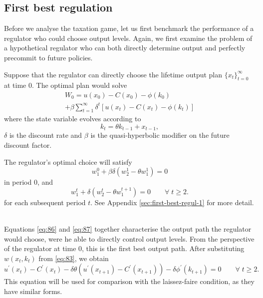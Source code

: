 \label{sec:benchm-regul}

\subsection{First best regulation}

\label{sec:first-best-regul}

Before we analyse the taxation game, let us first benchmark the performance
of a regulator who could choose output levels. Again, we first examine the
problem of a hypothetical regulator who can both directly determine output
and perfectly precommit to future policies. 

Suppose that the regulator can directly choose the lifetime output plan $%
\{x_{t}\}_{t=0}^{\infty }$ at time $0$. The optimal plan would solve 
\begin{multline}
W_{0}=u(x_{0})-C(x_{0})-\phi (k_{0})  \label{eq:38} \\
+\beta \sum_{t=1}^{\infty }\delta ^{t}\left[ u(x_{t})-C(x_{t})-\phi (k_{t})%
\right]
\end{multline}%
where the state variable evolves according to%
\[
k_{t}=\theta k_{t-1}+x_{t-1}, 
\]%
$\delta $ is the discount rate and $\beta $ is the quasi-hyperbolic modifier
on the future discount factor.

The regulator's optimal choice will satisfy 
\begin{equation}
w_{1}^{0}+\beta \delta \left( w_{2}^{1}-\theta w_{1}^{1}\right) =0
\label{eq:86}
\end{equation}%
in period 0, and 
\begin{equation}
w_{1}^{t}+\delta \left( w_{2}^{t}-\theta w_{1}^{t+1}\right) =0\qquad \forall
\;t\geq 2.  \label{eq:87}
\end{equation}%
for each subsequent period $t$. See Appendix \ref{sec:first-best-regul-1}
for more detail. \ 

Equations \eqref{eq:86} and \eqref{eq:87} together characterise the output
path the regulator would choose, were he able to directly control output
levels. From the perspective of the regulator at time $0$, this is the first
best output path. After substituting $w(x_{t},k_{t})$ from \eqref{eq:83}, we
obtain%
\begin{equation}
u^{\prime }(x_{t})-C^{\prime }(x_{t})-\delta \theta \left( u^{\prime
}(x_{t+1})-C^{\prime }(x_{t+1})\right) -\delta \phi ^{\prime
}(k_{t+1})=0\qquad \forall \;t\geq 2.  \label{eq:45}
\end{equation}%
This equation will be used for comparison with the laissez-faire condition,
as they have similar forms.

